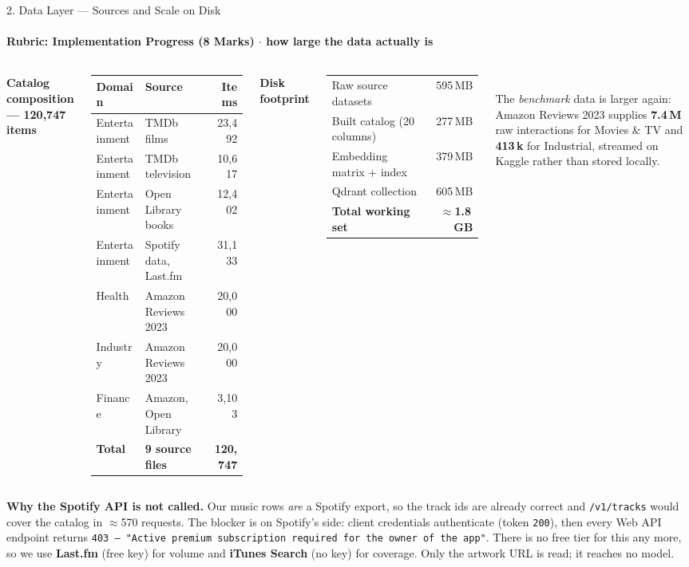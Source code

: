 \documentclass[aspectratio=169, 11pt]{beamer}
\newcommand{\eqs}{%
  \setlength{\abovedisplayskip}{3pt}%
  \setlength{\belowdisplayskip}{3pt}%
  \setlength{\abovedisplayshortskip}{2pt}%
  \setlength{\belowdisplayshortskip}{2pt}}
\newcommand{\blk}[1]{{\scriptsize\eqs\textbf{#1}}\par\vspace{0.9mm}}
\begin{document}
\begin{frame}[shrink]{2. Data Layer --- Sources and Scale on Disk}
\framesubtitle{Rubric: Implementation Progress (8 Marks) $\cdot$ how large the data actually is}
\vspace{0.5mm}
\begin{columns}[T]
\blk{Catalog composition --- 120{,}747 items}
{\tiny
\renewcommand{\arraystretch}{1.36}
\begin{tabular}{p{1.5cm} p{2.45cm} r}
\toprule
\textbf{Domain} & \textbf{Source} & \textbf{Items}\\
\midrule
Entertainment & TMDb films            & 23{,}492\\
Entertainment & TMDb television       & 10{,}617\\
Entertainment & Open Library books    & 12{,}402\\
Entertainment & Spotify data, Last.fm & 31{,}133\\
Health        & Amazon Reviews 2023   & 20{,}000\\
Industry      & Amazon Reviews 2023   & 20{,}000\\
Finance       & Amazon, Open Library  &  3{,}103\\
\midrule
\textbf{Total} & \textbf{9 source files} & \textbf{120{,}747}\\
\bottomrule
\end{tabular}}

\blk{Disk footprint}
{\tiny\eqs
\renewcommand{\arraystretch}{1.40}
\begin{tabular}{p{3.5cm} r}
\toprule
Raw source datasets            & 595\,MB\\
Built catalog (20 columns)     & 277\,MB\\
Embedding matrix + index       & 379\,MB\\
Qdrant collection              & 605\,MB\\
\midrule
\textbf{Total working set}     & \textbf{$\approx$1.8\,GB}\\
\bottomrule
\end{tabular}}\\[2mm]
{\tiny The \emph{benchmark} data is larger again: Amazon Reviews 2023 supplies \textbf{7.4\,M} raw
interactions for Movies \& TV and \textbf{413\,k} for Industrial, streamed on Kaggle rather than
stored locally.}
\end{columns}
\vspace{2mm}
{\scriptsize\textbf{Why the Spotify API is not called.} Our music rows \emph{are} a Spotify export,
so the track ids are already correct and \texttt{/v1/tracks} would cover the catalog in
$\approx$570 requests. The blocker is on Spotify's side: client credentials authenticate
(token \texttt{200}), then every Web API endpoint returns \texttt{403 --- "Active premium
subscription required for the owner of the app"}. There is no free tier for this any more, so we
use \textbf{Last.fm} (free key) for volume and \textbf{iTunes Search} (no key) for coverage.
Only the artwork URL is read; it reaches no model.}
\end{frame}
\end{document}
